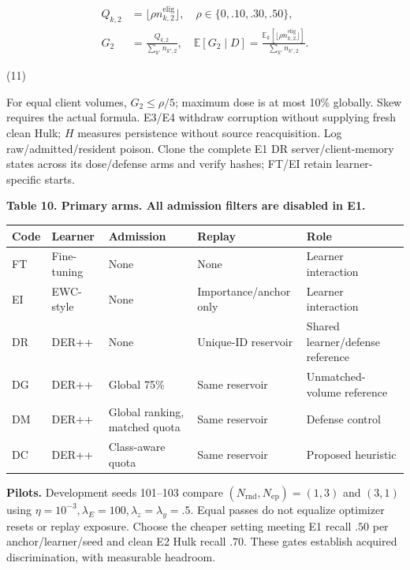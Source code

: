 \documentclass[10pt,a4paper]{article}
\begin{document}
\begin{equation}
\begin{aligned}
Q_{k,2}&=\lfloor\rho n^{\mathrm{elig}}_{k,2}\rfloor,\quad \rho\in\{0,.10,.30,.50\},\\
G_2&=\frac{Q_{k,2}}{\sum_{k'} n_{k',2}},\quad
\mathbb E[G_2\mid D]=\frac{\mathbb E_k[\lfloor\rho n^{\mathrm{elig}}_{k,2}\rfloor]}{\sum_{k'} n_{k',2}}.
\end{aligned}

\end{equation}
\par\hfill(11)\par

For equal client volumes, $G_2\le\rho/5$; maximum dose is at most 10\% globally. Skew requires the actual formula. E3/E4 withdraw corruption without supplying fresh clean Hulk; $H$ measures persistence without source reacquisition. Log raw/admitted/resident poison. Clone the complete E1 DR server/client-memory states across its dose/defense arms and verify hashes; FT/EI retain learner-specific starts.


\centering\footnotesize
\par\textbf{Table 10. Primary arms. All admission filters are disabled in E1.}\par


\begin{longtable}{p{1.0cm}p{1.2cm}l l l}
\toprule
Code & Learner & Admission & Replay & Role\\
\midrule
FT & Fine-tuning & None & None & Learner interaction\\
EI & EWC-style & None & Importance/anchor only & Learner interaction\\
DR & DER++ & None & Unique-ID reservoir & Shared learner/defense reference\\
DG & DER++ & Global 75\% & Same reservoir & Unmatched-volume reference\\
DM & DER++ & Global ranking, matched quota & Same reservoir & Defense control\\
DC & DER++ & Class-aware quota & Same reservoir & Proposed heuristic\\
\bottomrule
\end{longtable}


\textbf{Pilots.} Development seeds 101--103 compare $(N_{\mathrm{rnd}},N_{\mathrm{ep}})=(1,3)$ and $(3,1)$ using $\eta=10^{-3},\lambda_E=100,\lambda_z=\lambda_y=.5$. Equal passes do not equalize optimizer resets or replay exposure. Choose the cheaper setting meeting E1 recall $.50$ per anchor/learner/seed and clean E2 Hulk recall $.70$. These gates establish acquired discrimination, with measurable headroom.
\end{document}
